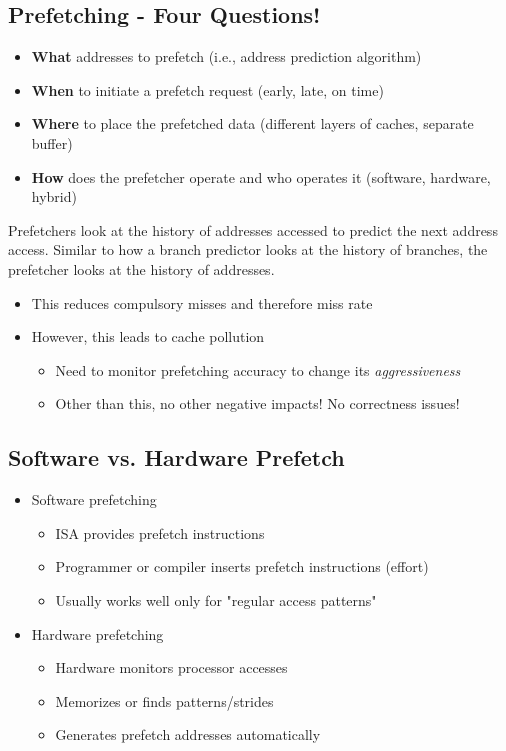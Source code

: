 \documentclass[10pt]{article}
\begin{document}
\subsection*{Prefetching - Four Questions!}
\begin{itemize}
    \item \textbf{What} addresses to prefetch (i.e., address prediction algorithm)
    \item \textbf{When} to initiate a prefetch request (early, late, on time)
    \item \textbf{Where} to place the prefetched data (different layers of caches, separate buffer)
    \item \textbf{How} does the prefetcher operate and who operates it (software, hardware, hybrid)
\end{itemize}
Prefetchers look at the history of addresses accessed to predict the next address access.  Similar to how a branch predictor looks at the history of branches, the prefetcher looks at the history of addresses.\\
\begin{itemize}
    \item This reduces compulsory misses and therefore miss rate
    \item However, this leads to cache pollution
    \begin{itemize}
        \item Need to monitor prefetching accuracy to change its \textit{aggressiveness}
        \item Other than this, no other negative impacts!  No correctness issues!
    \end{itemize}
\end{itemize}

\subsection*{Software vs. Hardware Prefetch}
\begin{itemize}
    \item Software prefetching
        \begin{itemize}
            \item ISA provides prefetch instructions
            \item Programmer or compiler inserts prefetch instructions (effort)
            \item Usually works well only for "regular access patterns"
        \end{itemize}
    \item Hardware prefetching
    \begin{itemize}
        \item Hardware monitors processor accesses
        \item Memorizes or finds patterns/strides
        \item Generates prefetch addresses automatically
    \end{itemize}
\end{itemize}
\end{document}
